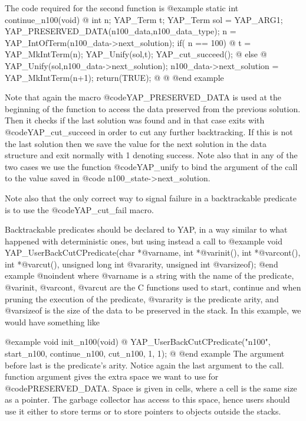 {{{{{{{{{The code required for the second function is
@example
static int continue_n100(void)
@{
      int n;
      YAP_Term t;
      YAP_Term sol = YAP_ARG1;
      YAP_PRESERVED_DATA(n100_data,n100_data_type);
      n = YAP_IntOfTerm(n100_data->next_solution);
      if( n == 100) @{
           t = YAP_MkIntTerm(n);
           YAP_Unify(sol,t);
           YAP_cut_succeed();
        @}
       else @{
           YAP_Unify(sol,n100_data->next_solution);
           n100_data->next_solution = YAP_MkIntTerm(n+1);
           return(TRUE);
        @}
@}
@end example

Note that again the macro @code{YAP_PRESERVED_DATA} is used at the
beginning of the function to access the data preserved from the previous
solution.  Then it checks if the last solution was found and in that
case exits with @code{YAP_cut_succeed} in order to cut any further
backtracking.  If this is not the last solution then we save the value
for the next solution in the data structure and exit normally with 1
denoting success. Note also that in any of the two cases we use the
function @code{YAP_unify} to bind the argument of the call to the value
saved in @code{ n100_state->next_solution}.


Note also that the only correct way to signal failure in a backtrackable
predicate is to use the @code{YAP_cut_fail} macro.

Backtrackable predicates should be declared to YAP, in a way
similar to what happened with deterministic ones, but using instead a
call to
@example
      void YAP_UserBackCutCPredicate(char *@var{name},
                 int *@var{init}(), int *@var{cont}(), int *@var{cut}(),
                 unsigned long int @var{arity}, unsigned int @var{sizeof});
@end example
@noindent
where @var{name} is a string with the name of the predicate, @var{init},
@var{cont}, @var{cut} are the C functions used to start, continue and
when pruning the execution of the predicate, @var{arity} is the
predicate arity, and @var{sizeof} is the size of the data to be
preserved in the stack. In this example, we would have something like

@example
void
init_n100(void)
@{
  YAP_UserBackCutCPredicate("n100", start_n100, continue_n100, cut_n100, 1, 1);
@}
@end example
The argument before last is the predicate's arity. Notice again the
last argument to the call. function argument gives the extra space we
want to use for @code{PRESERVED_DATA}. Space is given in cells, where
a cell is the same size as a pointer. The garbage collector has access
to this space, hence users should use it either to store terms or to
store pointers to objects outside the stacks.

}}}}}}}}}
